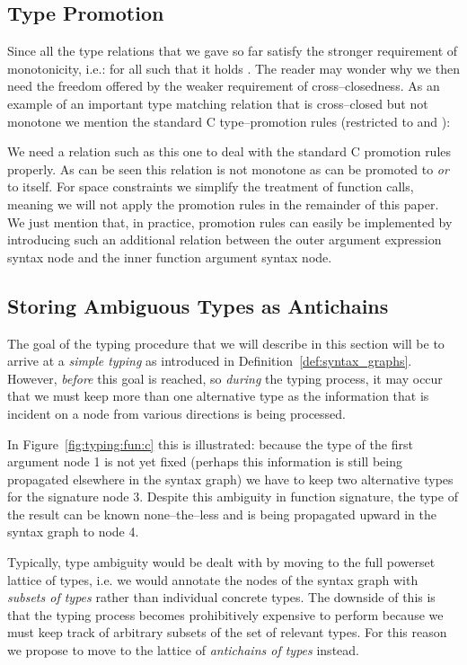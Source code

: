 \documentclass{sigplanconf}
\newcommand{\concept}[1]{\emph{#1}}
\begin{document}
\subsection{Type Promotion}

Since all the type relations that we gave so far satisfy the stronger
requirement of monotonicity, i.e.: for all 
such that  it holds . The reader may
wonder why we then need the freedom offered by the weaker requirement
of cross--closedness. As an example of an important type matching
relation that is cross--closed but not monotone we mention the
standard C type--promotion rules (restricted to  and
):

We need a relation such as this one to deal with the standard C
promotion rules properly. As can be seen this relation is not monotone
as  can be promoted to  \emph{or} to itself. For
space constraints we simplify the treatment of function calls, meaning
we will not apply the promotion rules in the remainder of this
paper. We just mention that, in practice, promotion rules can easily
be implemented by introducing such an additional relation
 between the outer argument expression syntax node and
the inner function argument syntax node.

\subsection{Storing Ambiguous Types as Antichains}\label{sec:antichains}

The goal of the typing procedure that we will describe in this section
will be to arrive at a \concept{simple typing} as introduced in
Definition~\ref{def:syntax_graphs}. However, \emph{before} this goal
is reached, so \emph{during} the typing process, it may occur that we
must keep more than one alternative type as the information that is
incident on a node from various directions is being processed.

In Figure~\ref{fig:typing:fun:c} this is illustrated: because the type of
the first argument node 1 is not yet fixed (perhaps this information
is still being propagated elsewhere in the syntax graph) we have to
keep two alternative types for the signature node 3. Despite this
ambiguity in function signature, the type of the result can be known
none--the--less and is being propagated upward in the syntax graph to
node 4.

Typically, type ambiguity would be dealt with by moving to the full
powerset lattice of types, i.e. we would annotate the nodes of the
syntax graph with \emph{subsets of types} rather than individual
concrete types. The downside of this is that the typing process
becomes prohibitively expensive to perform because we must keep track
of arbitrary subsets of the set of relevant types. For this reason we
propose to move to the lattice of \concept{antichains of types}
instead.
\end{document}
